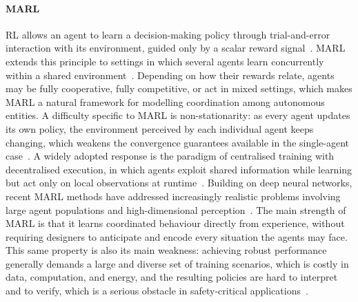 \paragraph{\acl{MARL}}
\ac{RL}
allows an agent to learn a decision-making policy through
trial-and-error interaction with its environment,
guided only by a scalar reward signal~\cite{sutton2018reinforcement}.
%
\ac{MARL} extends this principle
to settings in which several agents learn concurrently
within a shared environment~\cite{busoniu2008comprehensive}.
%
Depending on how their rewards relate,
agents may be
fully cooperative,
fully competitive,
or act in mixed settings,
which
makes \ac{MARL} a natural framework for modelling coordination among autonomous entities.
%
A difficulty specific to \ac{MARL} is non-stationarity:
as every agent updates its own policy,
the environment perceived by each individual agent keeps changing,
which weakens the convergence guarantees available in the single-agent case~\cite{busoniu2008comprehensive}.
%
A widely adopted response is the paradigm of
centralised training with decentralised execution,
in which agents exploit shared information
while learning but act only on local observations at runtime~\cite{lowe2017multi}.
%
Building on deep neural networks,
recent \ac{MARL} methods have addressed increasingly realistic problems
involving large agent populations
and
high-dimensional perception~\cite{gronauer2022multi}.
%
The main strength of \ac{MARL} is
that it learns coordinated behaviour directly from experience,
without requiring designers to anticipate and encode every situation the agents may face.
%
This same property is also its main weakness:
achieving robust performance generally demands
a large and diverse set of training scenarios,
which is costly in
data, computation, and energy,
and
the resulting policies are hard to interpret and to verify,
which is
a serious obstacle in safety-critical applications~\cite{gronauer2022multi}.

